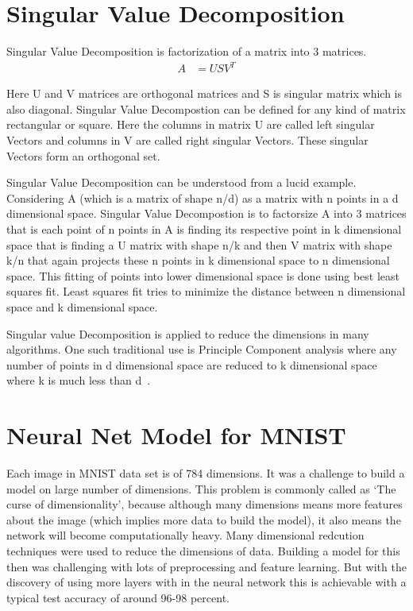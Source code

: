 \section{Singular Value Decomposition}

Singular Value Decomposition is factorization of a matrix into 3 matrices.
\begin{align*}  
A&=USV^{T}  
\end{align*}

Here U and V matrices are orthogonal matrices and S is singular matrix which is
also diagonal. Singular Value Decompostion can be defined for any kind of matrix
rectangular or square. Here the columns in matrix U are called left singular
Vectors and columns in V are called right singular Vectors. These singular
Vectors form an orthogonal set. 
   
Singular Value Decomposition can be understood from a lucid example. Considering
A (which is a matrix of shape n/d) as a matrix with n points in a d dimensional
space. Singular Value Decompostion is to factorsize A into 3 matrices that is
each point of n points in A is finding its respective point in k dimensional
space that is finding a U matrix with shape n/k and then V matrix with shape k/n
that again projects these n points in k dimensional space to n dimensional
space. This fitting of points into lower dimensional space is done using best
least squares fit. Least squares fit tries to minimize the distance between n
dimensional space and k dimensional space.

Singular value Decomposition is applied to reduce the dimensions in many
algorithms. One such traditional use is Principle Component analysis where any
number of points in d dimensional space are reduced to k dimensional space where
k is much less than d~\cite{hid-sp18-401-svd}.

\section{Neural Net Model for MNIST}

Each image in MNIST data set is of 784 dimensions. It was a challenge to build
a model on large number of dimensions. This problem is commonly called as `The
curse of dimensionality', because although many dimensions means more features
about the image (which implies more data to build the model), it also means
the network will become computationally heavy. Many dimensional redcution
techniques were used to reduce the dimensions of data. Building a model for
this then was challenging with lots of preprocessing and feature learning. But
with the discovery of using more layers with in the neural network this is
achievable with a typical test accuracy of around 96-98 percent.

